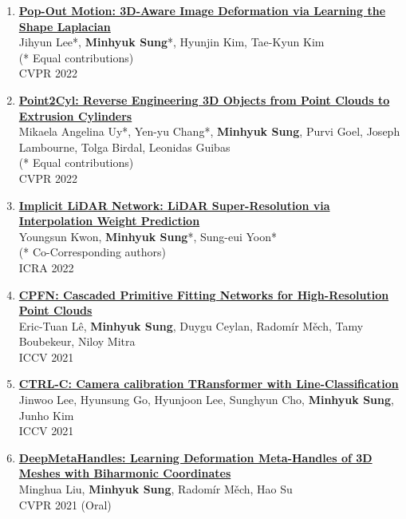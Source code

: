 \documentclass[letterpaper,10pt]{article} %
\newcommand{\blankline}{\quad\pagebreak[2]}
\begin{document}
\begin{enumerate}
\item \label{cvpr22_2}
\href{https://arxiv.org/abs/2203.15235}{\textbf{Pop-Out Motion: 3D-Aware Image Deformation via Learning the Shape Laplacian}}\\
Jihyun Lee*, \textbf{Minhyuk Sung}*, Hyunjin Kim, Tae-Kyun Kim\\
(* Equal contributions)\\
CVPR 2022\\
\blankline

\item \label{cvpr22_1}
\href{https://arxiv.org/abs/2109.02259}{\textbf{Point2Cyl: Reverse Engineering 3D Objects from Point Clouds to Extrusion Cylinders}}\\
Mikaela Angelina Uy*, Yen-yu Chang*, \textbf{Minhyuk Sung}, Purvi Goel, Joseph Lambourne, Tolga Birdal, Leonidas Guibas\\
(* Equal contributions)\\
CVPR 2022\\
\blankline

\item \label{icra22}
\href{https://arxiv.org/abs/2203.06413}{\textbf{Implicit LiDAR Network: LiDAR Super-Resolution via Interpolation Weight Prediction}}\\
Youngsun Kwon, \textbf{Minhyuk Sung}*, Sung-eui Yoon*\\
(* Co-Corresponding authors)\\
ICRA 2022\\
\blankline

\item \label{iccv21_2}
\href{https://arxiv.org/abs/2109.00113}{\textbf{CPFN: Cascaded Primitive Fitting Networks for High-Resolution Point Clouds}}\\
Eric-Tuan Lê, \textbf{Minhyuk Sung}, Duygu Ceylan, Radomír Měch, Tamy Boubekeur, Niloy Mitra\\
ICCV 2021\\
\blankline

\item \label{iccv21_1}
\href{https://arxiv.org/abs/2109.02259}{\textbf{CTRL-C: Camera calibration TRansformer with Line-Classification}}\\
Jinwoo Lee, Hyunsung Go, Hyunjoon Lee, Sunghyun Cho, \textbf{Minhyuk Sung}, Junho Kim\\
ICCV 2021\\
\blankline

\item \label{cvpr21_3}
\href{https://mhsung.github.io/papers/deep-meta-handles.html}{\textbf{DeepMetaHandles: Learning Deformation Meta-Handles of 3D Meshes with Biharmonic Coordinates}}\\
Minghua Liu, \textbf{Minhyuk Sung}, Radomír Měch, Hao Su\\
CVPR 2021 (Oral)\\
\blankline


\end{enumerate}
\end{document}
